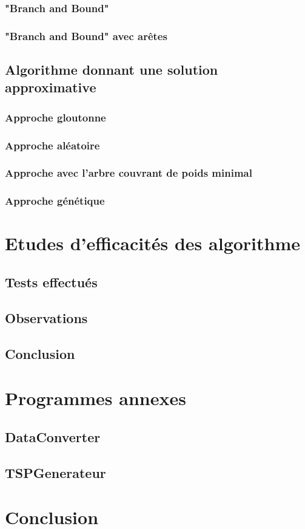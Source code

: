 \documentclass[10pt,a4paper]{report}
\begin{document}
		\subsubsection{"Branch and Bound"}	
		
		\subsubsection{"Branch and Bound" avec arêtes}	
		
	\subsection{Algorithme donnant une solution approximative}
	
		\subsubsection{Approche gloutonne}
		
		\subsubsection{Approche aléatoire}
		
		\subsubsection{Approche avec l'arbre couvrant de poids minimal}
		
		\subsubsection{Approche génétique}
		
\section{Etudes d'efficacités des algorithme}

	\subsection{Tests effectués}
	
	\subsection{Observations}
	
	\subsection{Conclusion}

\section{Programmes annexes}

	\subsection{DataConverter}
	
	\subsection{TSPGenerateur}
	
\section{Conclusion}
	
\end{document}
